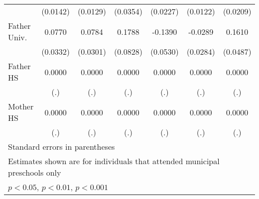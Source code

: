\begin{table}[htbp]
\begin{tabular}{l*{6}{c}}
            &    (0.0142)         &    (0.0129)         &    (0.0354)         &    (0.0227)         &    (0.0122)         &    (0.0209)         \\
\addlinespace
Father Univ.&      0.0770\sym{*}  &      0.0784\sym{**} &      0.1788\sym{*}  &     -0.1390\sym{**} &     -0.0289         &      0.1610\sym{**} \\
            &    (0.0332)         &    (0.0301)         &    (0.0828)         &    (0.0530)         &    (0.0284)         &    (0.0487)         \\
\addlinespace
Father HS   &      0.0000         &      0.0000         &      0.0000         &      0.0000         &      0.0000         &      0.0000         \\
            &         (.)         &         (.)         &         (.)         &         (.)         &         (.)         &         (.)         \\
\addlinespace
Mother HS   &      0.0000         &      0.0000         &      0.0000         &      0.0000         &      0.0000         &      0.0000         \\
            &         (.)         &         (.)         &         (.)         &         (.)         &         (.)         &         (.)         \\
\bottomrule
\multicolumn{7}{l}{\footnotesize Standard errors in parentheses}\\
\multicolumn{7}{l}{\footnotesize Estimates shown are for individuals that attended municipal preschools only}\\
\multicolumn{7}{l}{\footnotesize \sym{*} \(p<0.05\), \sym{**} \(p<0.01\), \sym{***} \(p<0.001\)}\\
\end{tabular}
\end{table}
